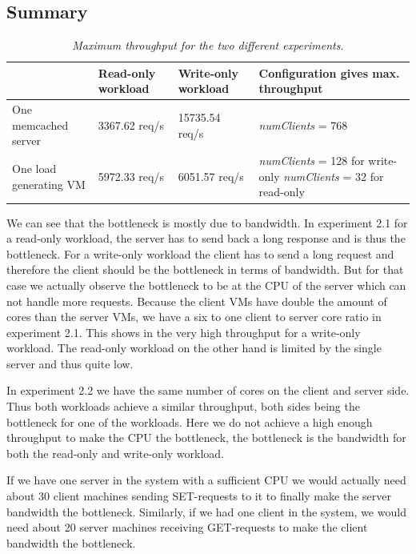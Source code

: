 \documentclass[11pt,a4paper]{article}
\newcommand{\ku}[1]{\textit{#1}}
\begin{document}
\subsection{Summary}

	\begin{table}[H]
	\centering
		\begin{tabular}{|l|p{2.5cm}|p{2.5cm}|p{5.4cm}|}
			\hline                        					& Read-only workload 	& Write-only workload 	& Configuration gives max. throughput \\ 
			\hline One memcached server   &  3367.62 req/s   		&  15735.54 req/s 	 		&   \ku{numClients} = 768                                 \\ 
			\hline One load generating VM 	&   5972.33 req/s  		&  6051.57 req/s    		&  \ku{numClients} =  128 for write-only  \ku{numClients} = 32 for read-only                               \\ 
			\hline 
		\end{tabular}
		\caption{\textit{Maximum throughput for the two different experiments.}}
		\label{Table:2_table}
	\end{table}

We can see that the bottleneck is mostly due to bandwidth. In experiment 2.1 for a read-only workload, the server has to send back a long response and is thus the bottleneck. For a write-only workload the client has to send a long request and therefore the client should be the bottleneck in terms of bandwidth. But for that case we actually observe the bottleneck to be at the CPU of the server which can not handle more requests. Because the client VMs have double the amount of cores than the server VMs, we have a six to one client to server core ratio in experiment 2.1. This shows in the very high throughput for a write-only workload. The read-only workload on the other hand is limited by the single server and thus quite low. 

In experiment 2.2 we have the same number of cores on the client and server side. Thus both workloads achieve a similar throughput, both sides being the bottleneck for one of the workloads. Here we do not achieve a high enough throughput to make the CPU the bottleneck, the bottleneck is the bandwidth for both the read-only and write-only workload.

If we have one server in the system with a sufficient CPU we would actually need about 30 client machines sending SET-requests to it to finally make the server bandwidth the bottleneck. Similarly, if we had one client in the system, we would need about 20 server machines receiving GET-requests to make the client bandwidth the bottleneck.
\end{document}
